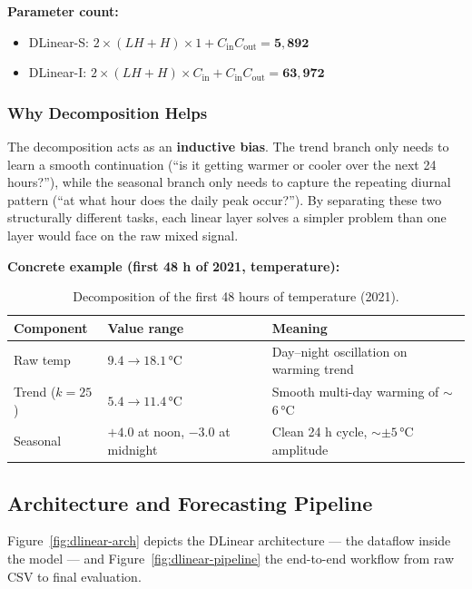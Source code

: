 \documentclass[12pt,a4paper,oneside]{report}
\begin{document}
\textbf{Parameter count:}
\begin{itemize}
  \item DLinear-S: $2 \times (LH + H) \times 1 + C_{\text{in}} C_{\text{out}}
        = \mathbf{5{,}892}$
  \item DLinear-I: $2 \times (LH + H) \times C_{\text{in}} + C_{\text{in}}
        C_{\text{out}} = \mathbf{63{,}972}$
\end{itemize}

\subsubsection{Why Decomposition Helps}

The decomposition acts as an \textbf{inductive bias}. The trend branch only needs
to learn a smooth continuation (``is it getting warmer or cooler over the next 24
hours?''), while the seasonal branch only needs to capture the repeating diurnal
pattern (``at what hour does the daily peak occur?''). By separating these two
structurally different tasks, each linear layer solves a simpler problem than one
layer would face on the raw mixed signal.

\textbf{Concrete example (first 48 h of 2021, temperature):}
\begin{table}[H]
\centering
\caption{Decomposition of the first 48 hours of temperature (2021).}
\begin{tabular}{lll}
\toprule
Component & Value range & Meaning \\
\midrule
Raw temp  & $9.4 \to 18.1$\,°C & Day--night oscillation on warming trend \\
Trend ($k=25$) & $5.4 \to 11.4$\,°C & Smooth multi-day warming of $\sim$6\,°C \\
Seasonal & $+4.0$ at noon, $-3.0$ at midnight & Clean 24 h cycle, $\sim\pm 5$\,°C amplitude \\
\bottomrule
\end{tabular}
\end{table}

\subsection{Architecture and Forecasting Pipeline}

Figure~\ref{fig:dlinear-arch} depicts the DLinear architecture --- the dataflow
inside the model --- and Figure~\ref{fig:dlinear-pipeline} the end-to-end
workflow from raw CSV to final evaluation.
\end{document}
